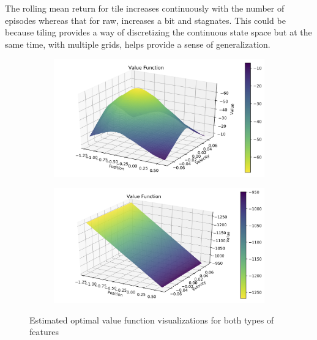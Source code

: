\documentclass[11pt,addpoints,answers]{exam}
\begin{document}
\begin{questions}
    \begin{your_solution}[title=Comment,height=5cm,width=15cm]
        The rolling mean return for tile increases continuously with the number of episodes whereas that for raw, increases a bit and stagnates. This could be because tiling provides a way of discretizing the continuous state space but at the same time, with multiple grids, helps provide a sense of generalization.
    \end{your_solution}
    \clearpage
    \begin{figure}[H]
        \centering
        \begin{subfigure}{0.5\textwidth}
            \includegraphics[width=\linewidth]{figs/value_A.png}
            \caption{}
            \label{fig:value_a}
        \end{subfigure}%
        \begin{subfigure}{0.5\textwidth}
            \includegraphics[width=\linewidth]{figs/value_B.png}
            \caption{}
            \label{fig:value_b}
        \end{subfigure}
        \caption{Estimated optimal value function visualizations for both types of features}
        \label{fig:value}
    \end{figure}
    

\end{questions}
\end{document}
